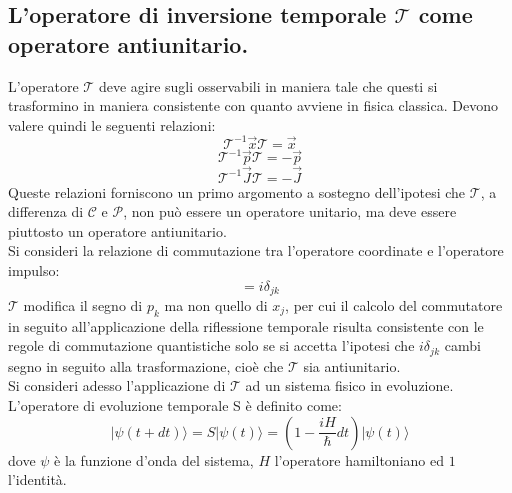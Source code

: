 \subsection{L'operatore di inversione temporale $\mathscr{T}$ come operatore antiunitario.}
\noindent
L'operatore $\mathscr{T}$ deve agire sugli osservabili in maniera tale che questi si trasformino in maniera consistente con  quanto avviene in fisica classica. Devono valere quindi le seguenti relazioni:
\begin{equation}
\mathscr{T}^{-1} \vec{x} \mathscr{T} = \vec{x}
\end{equation}
\begin{equation}
\mathscr{T}^{-1} \vec{p} \mathscr{T} = -\vec{p}
\end{equation}
\begin{equation}
\mathscr{T}^{-1} \vec{J} \mathscr{T} = -\vec{J}
\end{equation}
Queste relazioni forniscono un primo argomento a sostegno dell'ipotesi che $\mathscr{T}$, a differenza di $\mathscr{C}$ e $\mathscr{P}$, non pu\`o essere un operatore unitario, ma deve essere piuttosto un operatore antiunitario. \\
Si consideri la relazione di commutazione tra l'operatore coordinate e l'operatore impulso:
\begin{equation}
[x_j, p_k] = i\delta_{jk}
\end{equation}
$\mathscr{T}$ modifica il segno di $p_k$ ma non quello di $x_j$, per cui il calcolo del commutatore in seguito all'applicazione della riflessione temporale risulta consistente con le regole di commutazione quantistiche solo se si accetta l'ipotesi che
$i\delta_{jk}$ cambi segno in seguito alla trasformazione, cio\`e che $\mathscr {T}$ sia antiunitario.\\
Si consideri adesso l'applicazione di $\mathscr{T}$  ad un sistema fisico in evoluzione.
L'operatore di evoluzione temporale S \`e definito come:
\begin{equation}
|\psi(t+dt)\rangle = S|\psi(t)\rangle = (1-\frac{iH}{\hbar}dt)|\psi(t)\rangle
\end{equation}
dove $\psi$ è la funzione d'onda del sistema, $H$ l'operatore hamiltoniano ed $1$ l'identità.

